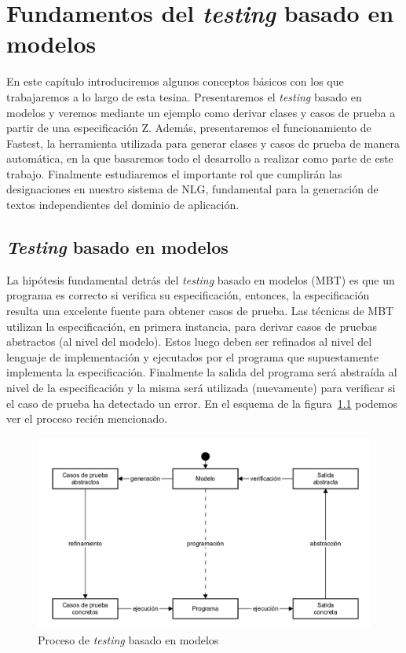 \chapter[\textit{Testing} Basado en Modelos]{Fundamentos del \textit{testing} basado en modelos}
\label{cap:fundamentos}

En este capítulo introduciremos algunos conceptos básicos con los que trabajaremos a lo largo de esta tesina. Presentaremos el \textit{testing} basado en modelos y veremos mediante un ejemplo como derivar clases y casos de prueba a partir de una especificación Z. Además, presentaremos el funcionamiento de Fastest, la herramienta utilizada para generar clases y casos de prueba de manera automática, en la que basaremos todo el desarrollo a realizar como parte de este trabajo. Finalmente estudiaremos el importante rol que cumplirán las designaciones en nuestro sistema de NLG, fundamental para la generación de textos independientes del dominio de aplicación.

\section{\textit{Testing} basado en modelos}

La hipótesis fundamental detrás del \textit{testing} basado en modelos (MBT) es que un programa es correcto si verifica su especificación, entonces, la especificación resulta una excelente fuente para obtener casos de prueba. Las técnicas de MBT utilizan la especificación, en primera instancia, para derivar casos de pruebas abstractos (al nivel del modelo). Estos luego deben ser refinados al nivel del lenguaje de implementación y ejecutados por el programa que supuestamente implementa la especificación. Finalmente la salida del programa será abstraída al nivel de la especificación y la misma será utilizada (nuevamente) para verificar si el caso de prueba ha detectado un error. En el esquema de la figura~\ref{fig:proc_mbt} podemos ver el proceso recién mencionado.

\begin{figure}[H]
\begin{center}
\includegraphics[scale=0.25]{img/proc_mbt.png}
\caption{Proceso de \textit{testing} basado en modelos}
\label{fig:proc_mbt}
\end{center}
\end{figure}


